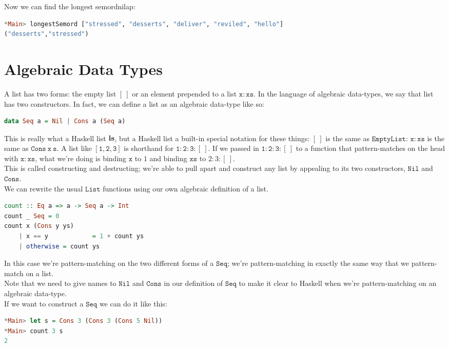 \documentclass[a4paper,12pt]{article}
\newcommand{\kwa}[1]{\mathtt{#1}}
\begin{document}
\noindent
Now we can find the longest semordnilap:

\begin{lstlisting}[language=Haskell]
*Main> longestSemord ["stressed", "desserts", "deliver", "reviled", "hello"]
("desserts","stressed")
\end{lstlisting}

\section{Algebraic Data Types}

\noindent
A list has two forms: the empty list $\kwa{[~]}$ or an element prepended to a list $\kwa{x:xs}$. In the language of algebraic data-types, we say that list has two constructors. In fact, we can define a list as an algebraic data-type like so:

\begin{lstlisting}[language=Haskell]
data Seq a = Nil | Cons a (Seq a)
\end{lstlisting}

\noindent
This is really what a Haskell list $\bf{is}$, but a Haskell list a built-in special notation for these things: $[~]$ is the same as $\kwa{EmptyList}$: $\kwa{x:xs}$ is the same as $\kwa{Cons~x~s}$. A list like $\kwa{[1,2,3]}$ is shorthand for $\kwa{1:2:3:[~]}$. If we passed in $\kwa{1:2:3:[~]}$ to a function that pattern-matches on the head with $\kwa{x:xs}$, what we're doing is binding $\kwa{x}$ to $1$ and binding $\kwa{xs}$ to $2:3:[~]$. \\

\noindent
This is called constructing and destructing; we're able to pull apart and construct any list by appealing to its two constructors, $\kwa{Nil}$ and $\kwa{Cons}$.\\

\noindent
We can rewrite the usual $\kwa{List}$ functions using our own algebraic definition of a list.

\begin{lstlisting}[language=Haskell]
count :: Eq a => a -> Seq a -> Int
count _ Seq = 0
count x (Cons y ys)
	| x == y			= 1 + count ys
	| otherwise	= count ys 
\end{lstlisting}

\noindent
In this case we're pattern-matching on the two different forms of a $\kwa{Seq}$; we're pattern-matching in exactly the same way that we pattern-match on a list. \\

\noindent
Note that we need to give names to $\kwa{Nil}$ and $\kwa{Cons}$ in our definition of $\kwa{Seq}$ to make it clear to Haskell when we're pattern-matching on an algebraic data-type. \\

\noindent
If we want to construct a $\kwa{Seq}$ we can do it like this: 

\begin{lstlisting}[language=Haskell]
*Main> let s = Cons 3 (Cons 3 (Cons 5 Nil))
*Main> count 3 s
2
\end{lstlisting}
\end{document}
